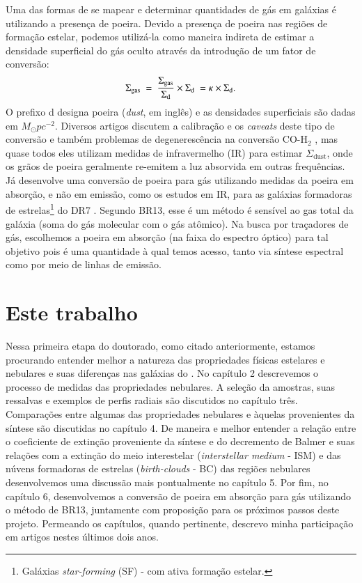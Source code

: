 Uma das formas de se mapear e determinar quantidades de gás em galáxias é utilizando a presença de
poeira. Devido a presença de poeira nas regiões de formação estelar, podemos utilizá-la como maneira
indireta de estimar a densidade superficial do gás oculto através da introdução de um fator de
conversão:
\begin{equation}
	\label{eq:dust2gas}
	\Sigma_{\mathrm{gas}}\ =\ \frac{\Sigma_{\mathrm{gas}}}{\Sigma_{\mathrm{d}}} \times \Sigma_{\mathrm{d}}\ = \kappa \times \Sigma_{\mathrm{d}}. 
\end{equation}
\noindent O prefixo d designa poeira ({\em dust}, em inglês) e as densidades superficiais são dadas
em $M_\odot pc^{-2}$. Diversos artigos discutem a calibração e os {\em caveats} deste tipo de
conversão e também problemas de degenerescência na conversão CO-$\mathrm{H}_2$ \citep{Guiderdoni.Rocca.1987,
Leroy.etal.2011a, Leroy.etal.2013a, RemyRuyer.etal.2014a}, mas quase todos eles utilizam medidas de
infravermelho (IR) para estimar $\Sigma_{\mathrm{dust}}$, onde os grãos de poeira geralmente
re-emitem a luz absorvida em outras frequências. Já \citet[][BR13 daqui em
diante]{Brinchmann.etal.2013a} desenvolve uma conversão de poeira para gás utilizando medidas da
poeira em absorção, e não em emissão, como os estudos em IR, para as galáxias formadoras de
estrelas\footnote{Galáxias {\em star-forming} (SF) - com ativa formação estelar.} do \SDSS DR7
\citep{Abazajian.etal.2009a}. Segundo BR13, esse é um método é sensível ao gas total da galáxia
(soma do gás molecular com o gás atômico). Na busca por traçadores de gás, escolhemos a poeira em
absorção (na faixa do espectro óptico) para tal objetivo pois é uma quantidade à qual temos acesso,
tanto via síntese espectral como por meio de linhas de emissão.

\section{Este trabalho}
\label{sec:intro:estetrabalho}

Nessa primeira etapa do doutorado, como citado anteriormente, estamos procurando entender melhor a
natureza das propriedades físicas estelares e nebulares e suas diferenças nas galáxias do \PCAL. No
capítulo 2 descrevemos o processo de medidas das propriedades nebulares. A seleção da amostras, suas
ressalvas e exemplos de perfis radiais são discutidos no capítulo três. Comparações entre algumas
das propriedades nebulares e àquelas provenientes da síntese são discutidas no capítulo 4. De
maneira e melhor entender a relação entre o coeficiente de extinção proveniente da síntese e do
decremento de Balmer e suas relações com a extinção do meio interestelar ({\em interstellar medium}
- ISM) e das núvens formadoras de estrelas ({\em birth-clouds} - BC) das regiões nebulares
desenvolvemos uma discussão mais pontualmente no capítulo 5. Por fim, no capítulo 6, desenvolvemos a
conversão de poeira em absorção para gás utilizando o método de BR13, juntamente com proposição para
os próximos passos deste projeto. Permeando os capítulos, quando pertinente, descrevo minha
participação em artigos nestes últimos dois anos.

